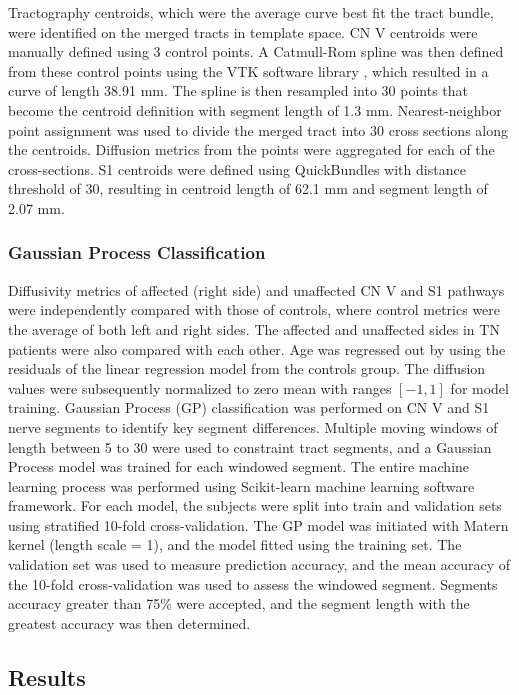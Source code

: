 Tractography centroids, which were the average curve best fit the tract bundle, were identified on the merged tracts in template space. CN V centroids were manually defined using 3 control points. A Catmull-Rom spline \cite{DeRose1988} was then defined from these control points using the VTK software library \cite{Schroeder2005}, which resulted in a curve of length 38.91 mm. The spline is then resampled into 30 points that become the centroid definition with segment length of 1.3 mm. Nearest-neighbor point assignment was used to divide the merged tract into 30 cross sections along the centroids. Diffusion metrics from the points were aggregated for each of the cross-sections.  S1 centroids were defined using QuickBundles \cite{Garyfallidis2012} with distance threshold of 30, resulting in centroid length of 62.1 mm and segment length of 2.07 mm. 

\subsubsection{Gaussian Process Classification}

Diffusivity metrics of affected (right side) and unaffected CN V and S1 pathways were independently compared with those of controls, where control metrics were the average of both left and right sides. The affected and unaffected sides in TN patients were also compared with each other. 
Age was regressed out by using the residuals of the linear regression model from the controls group. The diffusion values were subsequently normalized to zero mean with ranges $[-1, 1]$ for model training. 
Gaussian Process (GP) classification was performed on CN V and S1 nerve segments to identify key segment differences. Multiple moving windows of length between 5 to 30 were used to constraint tract segments, and a Gaussian Process model was trained for each windowed segment. The entire machine learning process was performed using Scikit-learn machine learning software framework.
For each model, the subjects were split into train and validation sets using stratified 10-fold cross-validation. The GP model was initiated with Matern kernel (length scale = 1), and the model fitted using the training set. The validation set was used to measure prediction accuracy, and the mean accuracy of the 10-fold cross-validation was used to assess the windowed segment. Segments accuracy greater than 75\% were accepted, and the segment length with the greatest accuracy was then determined. 

\subsection{Results}
